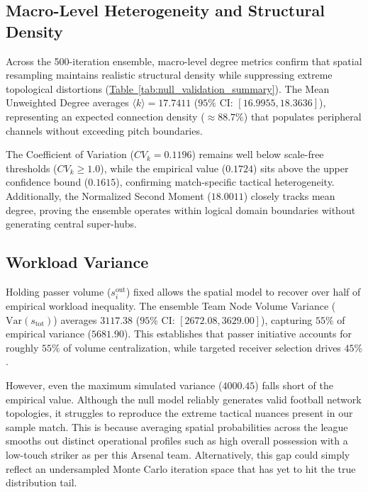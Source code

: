 \documentclass[12pt, a4paper]{article}
\begin{document}
\subsection{Macro-Level Heterogeneity and Structural Density}
\label{subsec:macro_heterogeneity_density}

Across the 500-iteration ensemble, macro-level degree metrics confirm that spatial resampling maintains realistic structural density while suppressing extreme topological distortions (\hyperref[tab:null_validation_summary]{Table~\ref{tab:null_validation_summary}}). The Mean Unweighted Degree averages $\langle k \rangle = 17.7411$ ($95\%$ CI: $[16.9955, 18.3636]$), representing an expected connection density ($\approx 88.7\%$) that populates peripheral channels without exceeding pitch boundaries.

The Coefficient of Variation ($CV_k = 0.1196$) remains well below scale-free thresholds ($CV_k \ge 1.0$), while the empirical value ($0.1724$) sits above the upper confidence bound ($0.1615$), confirming match-specific tactical heterogeneity. Additionally, the Normalized Second Moment ($18.0011$) closely tracks mean degree, proving the ensemble operates within logical domain boundaries without generating central super-hubs.

\subsection{Workload Variance}
\label{subsec:workload_variance}

Holding passer volume ($s_i^{\text{out}}$) fixed allows the spatial model to recover over half of empirical workload inequality. The ensemble Team Node Volume Variance ($\text{Var}(s_{\text{tot}})$) averages $3117.38$ ($95\%$ CI: $[2672.08, 3629.00]$), capturing $55\%$ of empirical variance ($5681.90$). This establishes that passer initiative accounts for roughly $55\%$ of volume centralization, while targeted receiver selection drives $45\%$.

However, even the maximum simulated variance ($4000.45$) falls short of the empirical value. Although the null model reliably generates valid football network topologies, it struggles to reproduce the extreme tactical nuances present in our sample match. This is because averaging spatial probabilities across the league smooths out distinct operational profiles such as high overall possession with a low-touch striker as per this Arsenal team. Alternatively, this gap could simply reflect an undersampled Monte Carlo iteration space that has yet to hit the true distribution tail.
\end{document}

